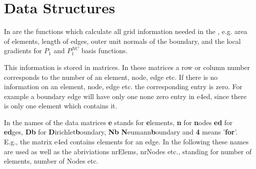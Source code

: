 \section{Data Structures}
\label{sect:DataStructures}
%
%

In  are the functions which calculate all grid information 
needed in the \FFW, e.g. area of elements, length of edges, outer unit normals 
of the boundary, and the local gradients for $P_1$ and $P_1^{NC}$ basis functions.

This information is stored in matrices. In these matrices a row or column number 
corresponds to the number of an element, node, edge etc. If there is no information 
on an element, node, edge etc. the corresponding entry is zero. For example a boundary 
edge will have only one none zero entry in e4ed, since there is only one element 
which contains it.


In the names of the data matrices \textbf{e} stands for \textbf{e}lements, \textbf{n} for \textbf{n}odes
\textbf{ed} for \textbf{ed}ges, \textbf{Db} for \textbf{D}irichlet\textbf{b}oundary, \textbf{Nb} 
\textbf{N}eumann\textbf{b}oundary and \textbf{4} means '\textbf{for}'. E.g., the matrix e4ed contains elements
for an edge. In the following these names are used as well as the abriviations nrElems, 
nrNodes etc., standing for number of elements, number of Nodes etc.

